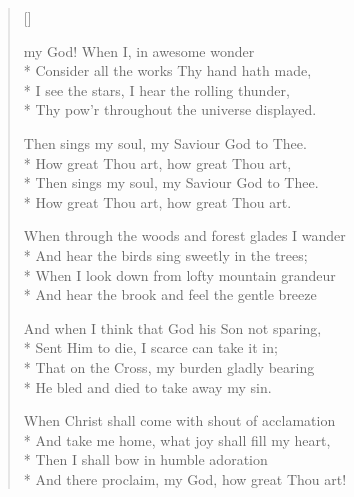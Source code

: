 \newHymn

\begin{verse}[\versewidth]

 my God! When I, in awesome wonder\\*
Consider all the works Thy hand hath made,\\*
I see the stars, I hear the rolling thunder,\\*
Thy pow'r throughout the universe displayed.

\begin{indentedVerse}
\vin Then sings my soul, my Saviour God to Thee.\\*
\vin How great Thou art, how great Thou art,\\*
\vin Then sings my soul, my Saviour God to Thee.\\*
\vin How great Thou art, how great Thou art.
\end{indentedVerse}

When through the woods and forest glades I wander\\*
And hear the birds sing sweetly in the trees;\\*
When I look down from lofty mountain grandeur\\*
And hear the brook and feel the gentle breeze

And when I think that God his Son not sparing,\\*
Sent Him to die, I scarce can take it in;\\*
That on the Cross, my burden gladly bearing \\*
He bled and died to take away my sin.

When Christ shall come with shout of acclamation\\*
And take me home, what joy shall fill my heart,\\*
Then I shall bow in humble adoration \\*
And there proclaim, my God, how great Thou art!

\end{verse}


